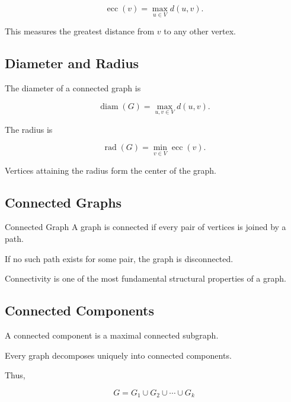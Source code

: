 \[
\boxed{
\operatorname{ecc}(v)
=
\max_{u\in V}d(u,v).
}
\]

This measures the greatest distance from \(v\) to any other vertex.

\subsection{Diameter and Radius}
\label{subsec:diameter-radius}

The diameter of a connected graph is

\[
\boxed{
\operatorname{diam}(G)
=
\max_{u,v\in V}d(u,v).
}
\]

The radius is

\[
\boxed{
\operatorname{rad}(G)
=
\min_{v\in V}\operatorname{ecc}(v).
}
\]

Vertices attaining the radius form the center of the graph.

\subsection{Connected Graphs}
\label{subsec:connected-graphs}

\begin{definitionbox}{Connected Graph}
A graph is connected if every pair of vertices is joined by a path.
\end{definitionbox}

If no such path exists for some pair, the graph is disconnected.

Connectivity is one of the most fundamental structural properties of a
graph.

\subsection{Connected Components}
\label{subsec:connected-components}

A connected component is a maximal connected subgraph.

Every graph decomposes uniquely into connected components.

Thus,

\[
\boxed{
G
=
G_1\cup G_2\cup\cdots\cup G_k
}
\]

